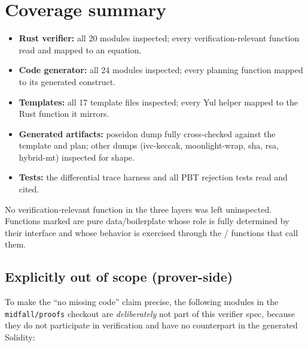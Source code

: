 \section{Coverage summary}
\label{sec:coverage-summary}

\begin{itemize}[leftmargin=1.4em,itemsep=2pt]
  \item \textbf{Rust verifier:} all 20 modules inspected; every
        verification-relevant function read and mapped to an equation.
  \item \textbf{Code generator:} all 24 modules inspected; every planning
        function mapped to its generated construct.
  \item \textbf{Templates:} all 17 template files inspected; every Yul
        helper mapped to the Rust function it mirrors.
  \item \textbf{Generated artifacts:} poseidon dump fully cross-checked
        against the template and plan; other dumps (ivc-keccak,
        moonlight-wrap, sha, rsa, hybrid-mt) inspected for shape.
  \item \textbf{Tests:} the differential trace harness and all PBT
        rejection tests read and cited.
\end{itemize}

No verification-relevant function in the three layers was left uninspected.
Functions marked  are pure data/boilerplate whose role is fully
determined by their interface and whose behavior is exercised through the
/ functions that call them.

\subsection{Explicitly out of scope (prover-side)}
\label{sec:out-of-scope}

To make the ``no missing code'' claim precise, the following modules in
the \texttt{midfall/proofs} checkout are \emph{deliberately} not part of
this verifier spec, because they do not participate in verification and
have no counterpart in the generated Solidity:

